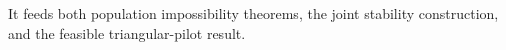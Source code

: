 It feeds both population impossibility theorems, the joint stability construction, and the feasible triangular-pilot result.